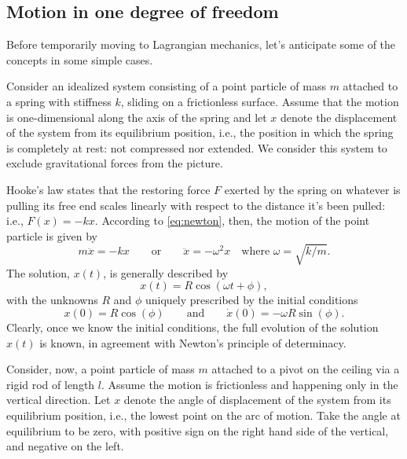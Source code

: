 \documentclass[english,fontsize=11pt,paper=a5,oneside]{scrbook}
\theoremstyle{definition}
\newenvironment{example}
  {\pushQED{\qed}\renewcommand{\qedsymbol}{$\lozenge$}\examplex}
  {\popQED\endexamplex}
\begin{document}
\subsection{Motion in one degree of freedom}

Before temporarily moving to Lagrangian mechanics, let's anticipate some of the concepts in some simple cases.

\begin{example}[Horizontal spring and pendulum]\label{ex:sprPen}
    Consider an idealized system consisting of a point particle of mass $m$ attached to a spring with stiffness $k$, sliding on a frictionless surface.
    Assume that the motion is one-dimensional along the axis of the spring and let $x$ denote the displacement of the system from its equilibrium position, i.e., the position in which the spring is completely at rest: not compressed nor extended. We consider this system to exclude gravitational forces from the picture.
    
    Hooke's law states that the restoring force $F$ exerted by the spring on whatever is pulling its free end scales linearly with respect to the distance it's been pulled: i.e., $F(x) = - k x$. According to \eqref{eq:newton}, then, the motion of the point particle is given by
    \begin{equation}\label{eq:spring}
        m \ddot{x} = - k x \qquad\mbox{or}\qquad \ddot{x} = - \omega^2 x \quad\mbox{where } \omega = \sqrt{k/m}.
    \end{equation}
    The solution, $x(t)$, is generally described by 
    \begin{equation}\label{eq:springsol}
        x(t) = R \cos(\omega t + \phi),
    \end{equation} with the unknowns $R$ and $\phi$ uniquely prescribed by the initial conditions
    \begin{equation}
        x(0) = R\cos(\phi) \qquad\mbox{and}\qquad \dot x(0) = -\omega R \sin(\phi).
    \end{equation}
    Clearly, once we know the initial conditions, the full evolution of the solution $x(t)$ is known, in agreement with Newton's principle of determinacy.
\medskip

    Consider, now, a point particle of mass $m$ attached to a pivot on the ceiling via a rigid rod of length $l$.
    Assume the motion is frictionless and happening only in the vertical direction.
    Let $x$ denote the angle of displacement of the system from its equilibrium position, i.e., the lowest point on the arc of motion. Take the angle at equilibrium to be zero, with positive sign on the right hand side of the vertical, and negative on the left.
    

\end{example}
\end{document}
